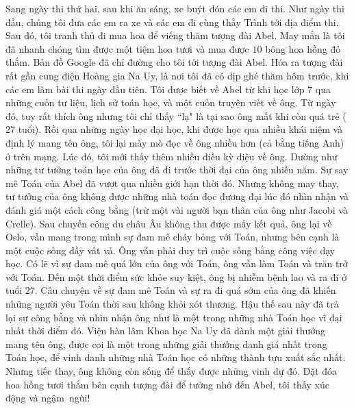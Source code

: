 \begin{multicols}{2}
	Sang ngày thi thứ hai, sau khi ăn sáng, xe buýt đón các em đi thi. Như ngày thi đầu, chúng tôi đưa các em ra xe và các em đi cùng thầy Trình tới địa điểm thi. Sau đó, tôi tranh thủ đi mua hoa để viếng thăm tượng đài Abel. May mắn là tôi đã nhanh chóng tìm được một tiệm hoa tươi và mua được $10$ bông hoa hồng đỏ thắm. Bản đồ Google đã chỉ đường cho tôi tới tượng đài Abel. Hóa ra tượng đài rất gần cung điện Hoàng gia Na Uy, là nơi tôi đã có dịp ghé thăm hôm trước, khi các em làm bài thi ngày đầu tiên.
	\vskip 0.05cm
	Tôi được biết về Abel từ khi học lớp $7$ qua những cuốn tư liệu, lịch sử toán học, và một cuốn truyện viết về ông. Từ ngày đó, tuy rất thích ông nhưng tôi chỉ thấy ``lạ" là tại sao ông mất khi còn quá trẻ ($27$ tuổi). Rồi qua những ngày học đại học, khi được học qua nhiều khái niệm và định lý mang tên ông, tôi lại mày mò đọc về ông nhiều hơn (cả bằng tiếng Anh) ở trên mạng. Lúc đó, tôi mới thấy thêm nhiều điều kỳ diệu về ông. Dường như những tư tưởng toán học của ông đã đi trước thời đại của ông nhiều năm. Sự say mê Toán của Abel đã vượt qua nhiều giới hạn thời đó. Nhưng không may thay, tư tưởng của ông không được những nhà toán đọc đương đại lúc đó nhìn nhận và đánh giá một cách công bằng (trừ một vài người bạn thân của ông như Jacobi và Crelle). Sau chuyến công du châu Âu không thu được mấy kết quả, ông lại về Oslo, vẫn mang trong mình sự đam mê cháy bỏng với Toán, nhưng bên cạnh là một cuộc sống đầy vất vả. Ông vẫn phải duy trì cuộc sống bằng công việc dạy học. Có lẽ vì sự đam mê quá lớn của ông với Toán, ông vẫn làm Toán và trăn trở với Toán. Đến một thời điểm sức khỏe suy kiệt, ông bị nhiễm bệnh lao và ra đi ở tuổi $27$. Câu chuyện về sự đam mê Toán và sự ra đi quá sớm của ông đã khiến những người yêu Toán thời sau không khỏi xót thương. Hậu thế sau này đã trả lại sự công bằng và nhìn nhận ông như là một trong những nhà Toán học vĩ đại nhất thời điểm đó. Viện hàn lâm Khoa học Na Uy đã dành một giải thưởng mang tên ông, được coi là một trong những giải thưởng danh giá nhất trong Toán học, để vinh danh những nhà Toán học có những thành tựu xuất sắc nhất. Nhưng tiếc thay, ông không còn sống để thấy được những vinh dự đó. Đặt đóa hoa hồng tươi thắm bên cạnh tượng đài để tưởng nhớ đến Abel, tôi thấy xúc động và ngậm~ngùi!

\end{multicols}
